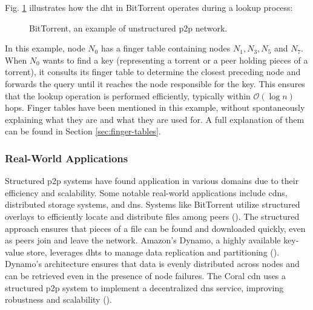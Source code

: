 Fig. \ref{fig:BitTorrent} illustrates how the \gls{dht} in BitTorrent operates during a lookup process:
\begin{figure}[htbp]
    \centering
{}
\caption{BitTorrent, an example of unstructured \gls{p2p} network.}
\label{fig:BitTorrent}
\end{figure}

In this example, node $N_0$ has a finger table containing nodes $N_1, N_3, N_5$ and $N_7$.
When $N_0$ wants to find a key (representing a torrent or a peer holding pieces of a torrent), it consults its finger table to determine the closest preceding node and forwards the query until it reaches the node responsible for the key.
This ensures that the lookup operation is performed efficiently, typically within $\mathcal{O}(\log n)$ hops.
Finger tables have been mentioned in this example, without spontaneously explaining what they are and what they are used for.
A full explanation of them can be found in Section \ref{sec:finger-tables}.

\subsubsection*{Real-World Applications}
Structured \gls{p2p} systems have found application in various domains due to their efficiency and scalability.
Some notable real-world applications include \glspl{cdn}, distributed storage systems, and \gls{dns}.
Systems like BitTorrent utilize structured overlays to efficiently locate and distribute files among peers (\cite{cohen2003incentives}).
The structured approach ensures that pieces of a file can be found and downloaded quickly, even as peers join and leave the network.
Amazon's Dynamo, a highly available key-value store, leverages \glspl{dht} to manage data replication and partitioning (\cite{DeCandia2007}).
Dynamo's architecture ensures that data is evenly distributed across nodes and can be retrieved even in the presence of node failures.
The Coral \gls{cdn} uses a structured \gls{p2p} system to implement a decentralized \gls{dns} service, improving robustness and scalability (\cite{CoralCDN2010}).

